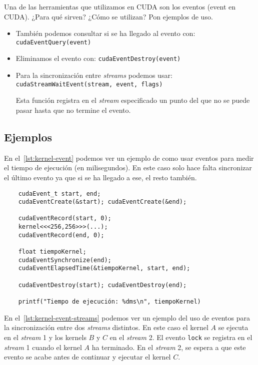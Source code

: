 \begin{pregunta}{Una de las herramientas que utilizamos en CUDA son los eventos (event en
CUDA). ¿Para qué sirven? ¿Cómo se utilizan? Pon ejemplos de uso.}
\begin{itemize}
    \item También podemos consultar si se ha llegado al evento con:
        \texttt{cudaEventQuery(event)}

    \item Eliminamos el evento con: \texttt{cudaEventDestroy(event)}

    \item Para la sincronización entre \emph{streams} podemos usar:
        \texttt{cudaStreamWaitEvent(stream, event, flags)}

        Esta función registra en el \emph{stream} especificado un punto del que
        no se puede pasar hasta que no termine el evento.
\end{itemize}

\subsection*{Ejemplos}

En el~\cref{lst:kernel-event} podemos ver un ejemplo de como usar eventos para
medir el tiempo de ejecución (en milisegundos). En este caso solo hace falta sincronizar el
último evento ya que si se ha llegado a ese, el resto también.

\begin{listing}[H]
    \caption{Medir el tiempo de ejecución de un kernel con \emph{events}}
    \label{lst:kernel-event}
    \begin{verbatim}
    cudaEvent_t start, end;
    cudaEventCreate(&start); cudaEventCreate(&end);

    cudaEventRecord(start, 0);
    kernel<<<256,256>>>(...);
    cudaEventRecord(end, 0);

    float tiempoKernel;
    cudaEventSynchronize(end);
    cudaEventElapsedTime(&tiempoKernel, start, end);

    cudaEventDestroy(start); cudaEventDestroy(end);

    printf("Tiempo de ejecución: %dms\n", tiempoKernel)
    \end{verbatim}
\end{listing}

En el~\cref{lst:kernel-event-streams} podemos ver un ejemplo del uso de eventos
para la sincronización entre dos \emph{streams} distintos. En este caso el
kernel $A$ se ejecuta en el \emph{stream} 1 y los kernels $B$ y $C$ en el
\emph{stream} 2. El evento \texttt{lock} se registra en el \emph{stream} 1
cuando el kernel $A$ ha terminado. En el \emph{stream} 2, se espera a que este
evento se acabe antes de continuar y ejecutar el kernel $C$.


\end{pregunta}
